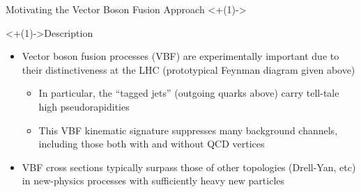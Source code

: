 \documentclass[handout]{beamer}
\begin{document}
\begin{frame}{Motivating the Vector Boson Fusion Approach}
    \centering
    \uncover<+(1)->{
    }
    
    \begin{block}<+(1)->{Description}
        \begin{itemize}[<+(1)->]
            \item Vector boson fusion processes (VBF) are experimentally important due to their distinctiveness at the LHC (prototypical Feynman diagram given above)
            \begin{itemize}[<+(1)->]
                \item In particular, the ``tagged jets'' (outgoing quarks above) carry tell-tale high pseudorapidities
                \item This VBF kinematic signature suppresses many background channels, including those both with and without QCD vertices 
            \end{itemize}
            \item VBF cross sections typically surpass those of other topologies (Drell-Yan, etc) in new-physics processes with sufficiently heavy new particles
        \end{itemize}
    \end{block}
\end{frame}
\end{document}
